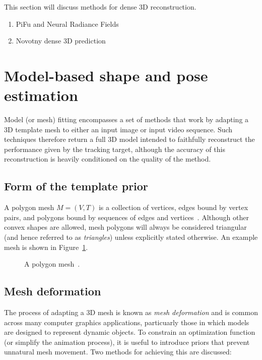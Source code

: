 This section will discuss methods for dense 3D reconstruction. 

\begin{enumerate}
    \item PiFu and Neural Radiance Fields
    \item Novotny dense 3D prediction
\end{enumerate}

\section{Model-based shape and pose estimation}
    Model (or mesh) fitting encompasses a set of methods that work by adapting a 3D template mesh to either an input image or input video sequence. Such techniques therefore return a full 3D model intended to faithfully reconstruct the performance given by the tracking target, although the accuracy of this reconstruction is heavily conditioned on the quality of the method.
    

    \subsection{Form of the template prior}
    A polygon mesh $M = (V, T)$ is a collection of vertices, edges bound by vertex pairs, and polygons bound by sequences of edges and vertices~\cite{smith2006vertex}. Although other convex shapes are allowed, mesh polygons will always be considered triangular (and hence referred to as \emph{triangles}) unless explicitly stated otherwise. An example mesh is shown in Figure~\ref{fig:polygon_mesh}. 
    
    \begin{figure}[H] %
        \caption{A polygon mesh~\cite{polygon_mesh}.}
        \label{fig:polygon_mesh}
    \end{figure}

    
    \subsection{Mesh deformation}
    The process of adapting a 3D mesh is known as \textit{mesh deformation} and is common across many computer graphics applications, particuarly those in which models are designed to represent dynamic objects. To constrain an optimization function (or simplify the animation process), it is useful to introduce priors that prevent unnatural mesh movement. Two methods for achieving this are discussed:

